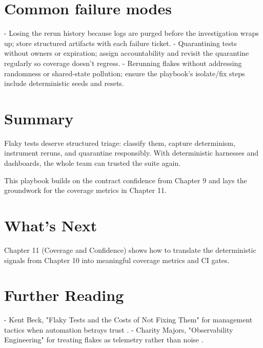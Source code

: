 \section{Common failure modes}
- Losing the rerun history because logs are purged before the investigation wraps up; store structured artifacts with each failure ticket.
- Quarantining tests without owners or expiration; assign accountability and revisit the quarantine regularly so coverage doesn’t regress.
- Rerunning flakes without addressing randomness or shared-state pollution; ensure the playbook’s isolate/fix steps include deterministic seeds and resets.

\section{Summary}
Flaky tests deserve structured triage: classify them, capture determinism, instrument reruns, and quarantine responsibly. With deterministic harnesses and dashboards, the whole team can trusted the suite again.

This playbook builds on the contract confidence from Chapter 9 and lays the groundwork for the coverage metrics in Chapter 11.

\section{What's Next}
Chapter 11 (Coverage and Confidence) shows how to translate the deterministic signals from Chapter 10 into meaningful coverage metrics and CI gates.

\section{Further Reading}
- Kent Beck, "Flaky Tests and the Costs of Not Fixing Them" for management tactics when automation betrays trust \citep{beck2020flaky}.  
- Charity Majors, "Observability Engineering" for treating flakes as telemetry rather than noise \citep{majors2023observability}.
